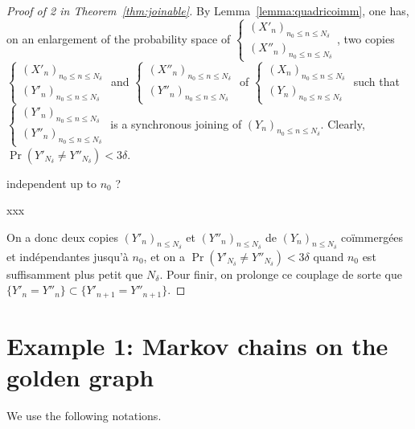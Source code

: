 \documentclass[12pt,a4paper]{article}
\begin{document}
\begin{proof}[Proof of 2 in Theorem~\ref{thm:joinable}]
By Lemma~\ref{lemma:quadricoimm}, 
one has, on an enlargement of the probability space of 
$\left\{\begin{smallmatrix} {(X'_n)}_{n_0 \leq n \leq N_\delta} \\ 
{(X''_n)}_{n_0 \leq n \leq N_\delta}
\end{smallmatrix}\right.$, two copies 
$\left\{\begin{smallmatrix} {(X'_n)}_{n_0 \leq n \leq N_\delta} \\ 
{(Y'_n)}_{n_0 \leq n \leq N_\delta}
\end{smallmatrix}\right.$ and 
$\left\{\begin{smallmatrix} {(X''_n)}_{n_0 \leq n \leq N_\delta} \\ 
{(Y''_n)}_{n_0 \leq n \leq N_\delta}
\end{smallmatrix}\right.$
of 
$\left\{\begin{smallmatrix} {(X_n)}_{n_0 \leq n \leq N_\delta} \\ 
{(Y_n)}_{n_0 \leq n \leq N_\delta}
\end{smallmatrix}\right.$ 
such that 
$\left\{\begin{smallmatrix} {(Y'_n)}_{n_0 \leq n \leq N_\delta} \\ 
{(Y''_n)}_{n_0 \leq n \leq N_\delta}
\end{smallmatrix}\right.$ is a synchronous joining of 
${(Y_n)}_{n_0 \leq n \leq N_\delta}$. 
Clearly,  $\Pr(Y'_{N_\delta} \neq Y''_{N_\delta}) < 3\delta$.

independent up to $n_0$ ?

xxx

On a donc  deux copies ${(Y'_n)}_{n \leq N_\delta}$ et ${(Y''_n)}_{n \leq N_\delta}$ 
de ${(Y_n)}_{n \leq N_\delta}$ coïmmergées et indépendantes jusqu'à $n_0$, 
et on a $\Pr(Y'_{N_\delta} \neq Y''_{N_\delta}) < 3\delta$ 
quand $n_0$ est suffisamment plus petit que $N_\delta$. 
Pour finir, on prolonge ce couplage de sorte que 
$\{Y'_n = Y''_n\} \subset \{Y'_{n+1} = Y''_{n+1}\}$.

\end{proof}


\section{Example 1: Markov chains on the golden graph} 

We use the following notations.
\end{document}
